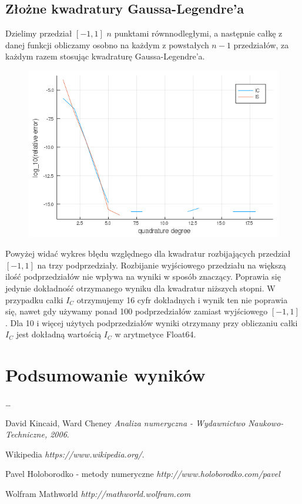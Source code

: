 \documentclass{article}
\begin{document}
\subsection*{Złożne kwadratury Gaussa-Legendre'a}
	Dzielimy przedział $[-1,1]$ $n$ punktami równnodległymi, a następnie całkę z danej funkcji obliczamy osobno na każdym z powstałych $n-1$ przedziałów, za każdym razem stosując kwadraturę Gaussa-Legendre'a. 

\begin{figure}[ht]
    \includegraphics[scale=0.5]{WykresD2logrelative.png}
    \label{WykresD2}
\end{figure}
Powyżej widać wykres błędu względnego dla kwadratur rozbijających przedział $[-1,1]$ na trzy podprzedziały. Rozbijanie wyjściowego przedziału na większą ilość podprzedziałów nie wpływa na wyniki w sposób znaczący. Poprawia się jedynie dokładność otrzymanego wyniku dla kwadratur niższych stopni. W przypadku całki $I_C$ otrzymujemy 16 cyfr dokładnych i wynik ten nie poprawia się, nawet gdy używamy ponad 100 podprzedziałów zamiast wyjściowego $[-1,1]$. Dla 10 i więcej użytych podprzedziałów wyniki otrzymany przy obliczaniu całki $I_C$ jest dokładną wartością $I_C$ w arytmetyce Float64.  

\section*{Podsumowanie wyników}
\dots
\begin{thebibliography}{9}

  
  David Kincaid, Ward Cheney
  \emph{Analiza numeryczna - Wydawnictwo Naukowo-Techniczne, 2006}.

  Wikipedia
  \emph{https://www.wikipedia.org/}.

	Pavel Holoborodko - metody numeryczne
		\emph{http://www.holoborodko.com/pavel}

	Wolfram Mathworld
		\emph{http://mathworld.wolfram.com}
\end{thebibliography}
\end{document}
